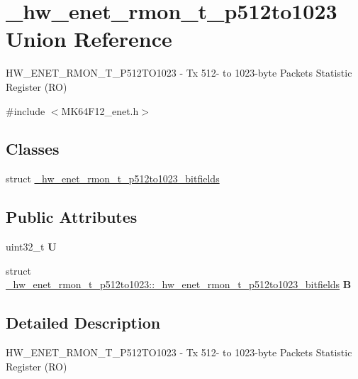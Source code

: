 \hypertarget{union__hw__enet__rmon__t__p512to1023}{}\section{\+\_\+hw\+\_\+enet\+\_\+rmon\+\_\+t\+\_\+p512to1023 Union Reference}
\label{union__hw__enet__rmon__t__p512to1023}


H\+W\+\_\+\+E\+N\+E\+T\+\_\+\+R\+M\+O\+N\+\_\+\+T\+\_\+\+P512\+T\+O1023 -\/ Tx 512-\/ to 1023-\/byte Packets Statistic Register (RO)  




{\ttfamily \#include $<$M\+K64\+F12\+\_\+enet.\+h$>$}

\subsection*{Classes}
\begin{DoxyCompactItemize}
\item 
struct \hyperlink{struct__hw__enet__rmon__t__p512to1023_1_1__hw__enet__rmon__t__p512to1023__bitfields}{\+\_\+hw\+\_\+enet\+\_\+rmon\+\_\+t\+\_\+p512to1023\+\_\+bitfields}
\end{DoxyCompactItemize}
\subsection*{Public Attributes}
\begin{DoxyCompactItemize}
\item 
uint32\+\_\+t {\bfseries U}\hypertarget{union__hw__enet__rmon__t__p512to1023_aed89a8727b84d36299ed599291b2b73c}{}\label{union__hw__enet__rmon__t__p512to1023_aed89a8727b84d36299ed599291b2b73c}

\item 
struct \hyperlink{struct__hw__enet__rmon__t__p512to1023_1_1__hw__enet__rmon__t__p512to1023__bitfields}{\+\_\+hw\+\_\+enet\+\_\+rmon\+\_\+t\+\_\+p512to1023\+::\+\_\+hw\+\_\+enet\+\_\+rmon\+\_\+t\+\_\+p512to1023\+\_\+bitfields} {\bfseries B}\hypertarget{union__hw__enet__rmon__t__p512to1023_a42040386ade278f883bb9dd57499d2e5}{}\label{union__hw__enet__rmon__t__p512to1023_a42040386ade278f883bb9dd57499d2e5}

\end{DoxyCompactItemize}


\subsection{Detailed Description}
H\+W\+\_\+\+E\+N\+E\+T\+\_\+\+R\+M\+O\+N\+\_\+\+T\+\_\+\+P512\+T\+O1023 -\/ Tx 512-\/ to 1023-\/byte Packets Statistic Register (RO) 

